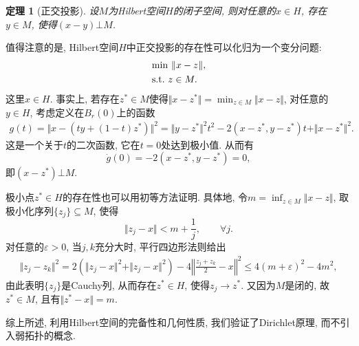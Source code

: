 \documentclass[12pt,a4paper]{article}
\newtheorem{theorem}{定理}[section]
\newtheorem{example}[theorem]{例}
\begin{document}
\begin{theorem}[正交投影]
    设$M$为Hilbert空间$H$的闭子空间, 则对任意的$x \in H$, 存在$y \in M$, 使得$(x - y) \bot M$.
\end{theorem}

值得注意的是, Hilbert空间$H$中正交投影的存在性可以化归为一个变分问题:
\begin{align*}
    &{\rm min}\ \Vert x - z \Vert, \\ 
    &{\rm s.t.}\ z \in M.
\end{align*}
这里$x \in H$. 事实上, 若存在$z^* \in M$使得$\Vert x - z^* \Vert = \min_{z \in M}\Vert x - z \Vert$, 对任意的$y \in H$, 考虑定义在$B_r(0)$上的函数 
\begin{align*}
    g(t) = \Vert x - (ty + (1 - t)z^*) \Vert^2 = \Vert y - z^* \Vert^2t^2 - 2(x - z^*, y - z^*)t + \Vert x - z^*\Vert^2.
\end{align*}
这是一个关于$t$的二次函数, 它在$t = 0$处达到极小值. 从而有 
\begin{equation*}
    \dot g(0) = -2(x - z^*, y - z^*) = 0,
\end{equation*}
即$(x - z^*) \bot M$.

极小点$z^* \in H$的存在性也可以用初等方法证明. 具体地, 令$m = \inf_{z \in M}\Vert x - z \Vert$, 取极小化序列$\{z_j\} \subseteq M$, 使得 
\begin{equation*}
    \Vert z_j - x \Vert < m + \frac{1}{j}, \qquad \forall j.
\end{equation*}
对任意的$\varepsilon > 0$, 当$j, k$充分大时, 平行四边形法则给出 
\begin{align*}
    \Vert z_j - z_k\Vert^2 = 2(\Vert z_j - x\Vert^2 + \Vert z_j - x \Vert^2) - 4\left\Vert \frac{z_j + z_k}{2} - x \right\Vert^2 \leq 4(m + \varepsilon)^2 - 4m^2,
\end{align*}
由此表明$\{z_j\}$是Cauchy列, 从而存在$z^* \in H$, 使得$z_j \rightarrow z^*$.
又因为$M$是闭的, 故$z^* \in M$, 且有$\Vert z^* - x \Vert = m$.

综上所述, 利用Hilbert空间的完备性和几何性质, 我们验证了Dirichlet原理, 而不引入弱拓扑的概念.

\end{document}
